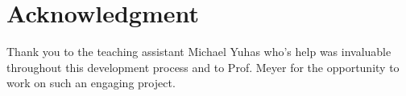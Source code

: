 %





\section*{Acknowledgment}

Thank you to the teaching assistant Michael Yuhas who's help was invaluable throughout this development process and to Prof. Meyer for the opportunity to work on such an engaging project.





%








